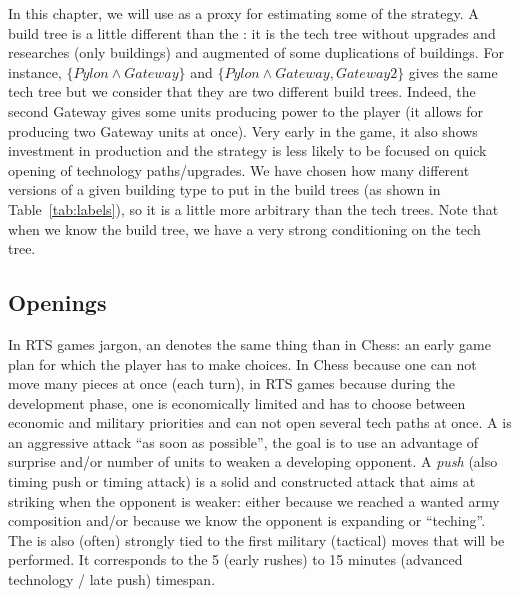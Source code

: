 In this chapter, we will use \textit{} as a proxy for estimating some of the strategy. A build tree is a little different than the : it is the tech tree without upgrades and researches (only buildings) and augmented of some duplications of buildings. For instance, $\{Pylon\wedge Gateway\}$ and $\{Pylon\wedge Gateway, Gateway2\}$ gives the same tech tree but we consider that they are two different build trees. Indeed, the second Gateway gives some units producing power to the player (it allows for producing two Gateway units at once). Very early in the game, it also shows investment in production and the strategy is less likely to be focused on quick opening of technology paths/upgrades. 
We have chosen how many different versions of a given building type to put in the build trees (as shown in Table~\ref{tab:labels}), so it is a little more arbitrary than the tech trees. Note that when we know the build tree, we have a very strong conditioning on the tech tree.



\subsection{Openings}
\label{sec:openings}


In RTS games jargon, an \textit{} denotes the same thing than in Chess: an early game plan for which the player has to make choices. In Chess because one can not move many pieces at once (each turn), in RTS games because during the development phase, one is economically limited and has to choose between economic and military priorities and can not open several tech paths at once. A \textit{} is an aggressive attack ``as soon as possible'', the goal is to use an advantage of surprise and/or number of units to weaken a developing opponent. A \textit{push} (also timing push or timing attack) is a solid and constructed attack that aims at striking when the opponent is weaker: either because we reached a wanted army composition and/or because we know the opponent is expanding or ``teching''. The  is also (often) strongly tied to the first military (tactical) moves that will be performed. It corresponds to the 5 (early rushes) to 15 minutes (advanced technology / late push) timespan. 

